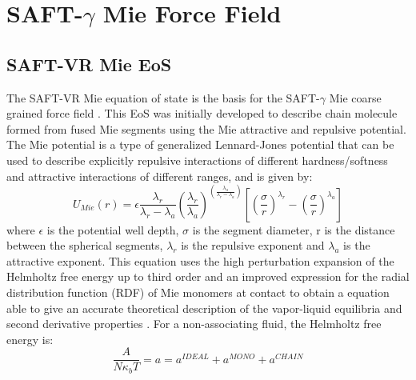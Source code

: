 
\chapter{SAFT-$\gamma$ Mie Force Field} %

\label{Chapter3} %


\section{SAFT-VR Mie EoS}

The SAFT-VR Mie equation of state \cite{lafitte2013} is the basis for the SAFT-$\gamma$ Mie coarse grained force field \cite{avendano2011}. This EoS was initially developed to describe chain molecule formed from fused Mie segments using the Mie attractive and repulsive potential. The Mie potential is a type of generalized Lennard-Jones potential that can be used to describe explicitly repulsive interactions of different hardness/softness and attractive interactions of different ranges, and is given by:
\begin{equation}
U_{Mie}(r) = \epsilon\frac{\lambda_r}{\lambda_r - \lambda_a} \left(\frac{\lambda_r}{\lambda_a} \right)^{\left( \frac{\lambda_a}{\lambda_r - \lambda_a} \right)}
\left[ \left(\frac{\sigma}{r} \right)^{\lambda_r} - \left(\frac{\sigma}{r} \right)^{\lambda_a} \right]
\label{eqn:miepotential}
\end{equation}
where $\epsilon$ is the potential well depth, $\sigma$ is the segment diameter, r is the distance between the spherical segments, $\lambda_r$ is the repulsive exponent and $\lambda_a$ is the attractive exponent. This equation uses the  high perturbation expansion of the Helmholtz free energy up to third order and an improved expression for the  radial distribution function (RDF) of Mie monomers at contact to obtain a equation able to give an accurate theoretical description of the vapor-liquid equilibria and second derivative properties \cite{lafitte2013}. For a non-associating fluid, the Helmholtz free energy is:
\begin{equation}
\frac{A}{N\kappa_{b}T} = a = a^{IDEAL} + a^{MONO} + a^{CHAIN}
\label{eqn:miehelm}
\end{equation}

